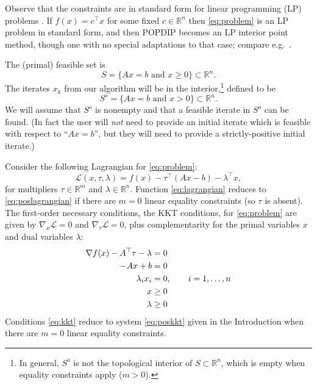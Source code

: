 \documentclass[11pt]{article}
\newcommand{\RR}{\mathbb{R}}
\newcommand{\grad}{\nabla}
\begin{document}
Observe that the constraints are in standard form for linear programming (LP) problems \cite[chapter 4]{GrivaNashSofer2009}.  If $f(x)=c^\top x$ for some fixed $c\in\RR^n$ then \eqref{eq:problem} is an LP problem in standard form, and then POPDIP becomes an LP interior point method, though one with no special adaptations to that case; compare e.g.~\cite{ZhangTapiaDennis1992}.

The (primal) feasible set is
\begin{equation}
S = \{Ax=b \text{ and } x\ge 0\} \subset \RR^n.  \label{eq:primalfeasible}
\end{equation}
The iterates $x_k$ from our algorithm will be in the interior,\footnote{In general, $S^o$ is not the topological interior of $S \subset \RR^n$, which is empty when equality constraints apply ($m>0$).} defined to be
\begin{equation}
S^o = \{Ax=b \text{ and } x > 0\} \subset \RR^n.  \label{eq:primalinterior}
\end{equation}
We will assume that $S^o$ is nonempty and that a feasible iterate in $S^o$ can be found.  (In fact the user will \emph{not} need to provide an initial iterate which is feasible with respect to ``$Ax=b$'', but they will need to provide a strictly-positive initial iterate.)

Consider the following Lagrangian for \eqref{eq:problem}:
\begin{equation}
\mathcal{L}(x,\tau,\lambda) = f(x) - \tau^\top (Ax - b) - \lambda^\top x, \label{eq:lagrangian}
\end{equation}
for multipliers $\tau\in\RR^m$ and $\lambda\in \RR^n$.  Function \eqref{eq:lagrangian} reduces to \eqref{eq:poslagrangian} if there are $m=0$ linear equality constraints (so $\tau$ is absent).  The first-order necessary conditions, the KKT conditions, for \eqref{eq:problem} are given by $\grad_x\mathcal{L}=0$ and $\grad_\tau\mathcal{L}=0$, plus complementarity for the primal variables $x$ and dual variables $\lambda$:
\begin{align}
\grad f(x) - A^\top \tau - \lambda &= 0 \label{eq:kkt} \\
-A x + b &= 0 \notag \\
\lambda_i x_i &=0, \qquad i=1,\dots,n \notag \\
x &\ge 0 \notag \\
\lambda &\ge 0 \notag
\end{align}
Conditions \eqref{eq:kkt} reduce to system \eqref{eq:poskkt} given in the Introduction when there are $m=0$ linear equality constraints.
\end{document}
